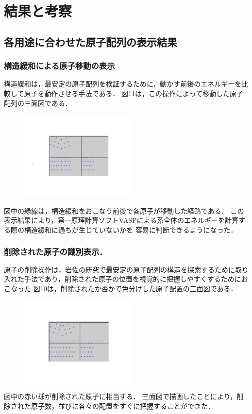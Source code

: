 
\section{結果と考察}
\subsection{各用途に合わせた原子配列の表示結果}
\subsubsection{構造緩和による原子移動の表示}
構造緩和は，最安定の原子配列を検証するために，動かす前後のエネルギーを比較して原子を動作させる手法である．
図11は，この操作によって移動した原子配列の三面図である．

\begin{figure}[htbp]\begin{center}
\includegraphics[width=6cm,bb=0 0 442 500]{../figs/./boundary_narita.010.jpg}
\caption{}
\label{default}\end{center}\end{figure}
図中の緑線は，構造緩和をおこなう前後で各原子が移動した経路である．
この表示結果により，第一原理計算ソフトVASPによる系全体のエネルギーを計算する際の構造緩和に過ちが生じていないかを
容易に判断できるようになった．

\subsubsection{削除された原子の識別表示．}
原子の削除操作は，岩佐の研究で最安定の原子配列の構造を探索するために取り入れた手法であり，削除された原子の位置を視覚的に把握しやすくするためにおこなった
図10は，削除されたか否かで色分けした原子配置の三面図である．

\begin{figure}[htbp]\begin{center}
\includegraphics[width=6cm,bb=0 0 442 500]{../figs/./boundary_narita.011.jpg}
\caption{}
\label{default}\end{center}\end{figure}
図中の赤い球が削除された原子に相当する．
三面図で描画したことにより，削除された原子数，並びに各々の配置をすぐに把握することができた．

